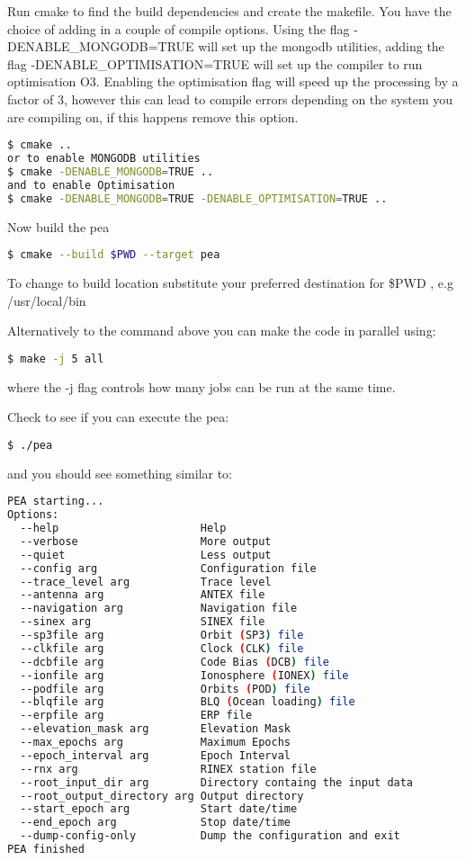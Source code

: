 Run cmake to find the build dependencies and create the makefile. You have the choice of adding in a couple of compile options. 
Using the flag -DENABLE\_MONGODB=TRUE will set up the mongodb utilities, adding the flag -DENABLE\_OPTIMISATION=TRUE will set up the compiler to run optimisation O3. 
Enabling the optimisation flag will speed up the processing by a factor of 3, however this can lead to compile errors depending on the system you are compiling on, if this happens remove this option.

\begin{lstlisting}[language=bash]
$ cmake ..
or to enable MONGODB utilities
$ cmake -DENABLE_MONGODB=TRUE ..
and to enable Optimisation
$ cmake -DENABLE_MONGODB=TRUE -DENABLE_OPTIMISATION=TRUE ..
\end{lstlisting} 
Now build the pea

\begin{lstlisting}[language=bash]
$ cmake --build $PWD --target pea
\end{lstlisting}

To change to build location substitute your preferred destination for \$PWD , e.g /usr/local/bin

Alternatively to the command above you can make the code in parallel using:
\begin{lstlisting}[language=bash]
$ make -j 5 all
\end{lstlisting}

where the -j flag controls how many jobs can be run at the same time.

Check to see if you can execute the pea:
\begin{lstlisting}[language=bash]
$ ./pea    
\end{lstlisting}

and you should see something similar to:
\begin{lstlisting}[language=bash]
PEA starting...
Options:
  --help                      Help
  --verbose                   More output
  --quiet                     Less output
  --config arg                Configuration file
  --trace_level arg           Trace level
  --antenna arg               ANTEX file
  --navigation arg            Navigation file
  --sinex arg                 SINEX file
  --sp3file arg               Orbit (SP3) file
  --clkfile arg               Clock (CLK) file
  --dcbfile arg               Code Bias (DCB) file
  --ionfile arg               Ionosphere (IONEX) file
  --podfile arg               Orbits (POD) file
  --blqfile arg               BLQ (Ocean loading) file
  --erpfile arg               ERP file
  --elevation_mask arg        Elevation Mask
  --max_epochs arg            Maximum Epochs
  --epoch_interval arg        Epoch Interval
  --rnx arg                   RINEX station file
  --root_input_dir arg        Directory containg the input data
  --root_output_directory arg Output directory
  --start_epoch arg           Start date/time
  --end_epoch arg             Stop date/time
  --dump-config-only          Dump the configuration and exit
PEA finished
\end{lstlisting}

